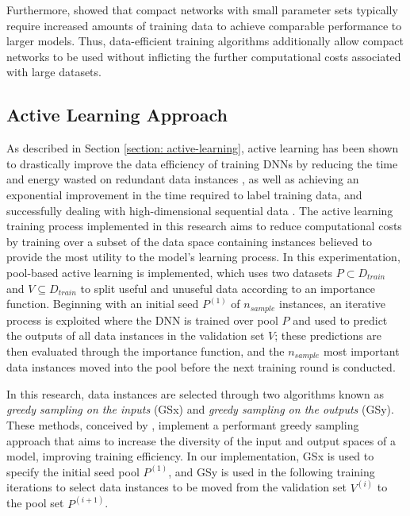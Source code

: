 \documentclass[a4paper, 11pt]{report}
\begin{document}
    Furthermore, \citet{bender-2021} showed that compact networks with small parameter sets typically require increased amounts of training data to achieve comparable performance to larger models. Thus, data-efficient training algorithms additionally allow compact networks to be used without inflicting the further computational costs associated with large datasets.


    \subsection{Active Learning Approach}
    \label{section: al-model}

    As described in Section \ref{section: active-learning}, active learning has been shown to drastically improve the data efficiency of training DNNs by reducing the time and energy wasted on redundant data instances \citep{xu-2021}, as well as achieving an exponential improvement in the time required to label training data, and successfully dealing with high-dimensional sequential data \citep{ren-2021}. The active learning training process implemented in this research aims to reduce computational costs by training over a subset of the data space containing instances believed to provide the most utility to the model's learning process. In this experimentation, pool-based active learning is implemented, which uses two datasets $P \subset D_{train}$ and $V \subseteq D_{train}$ to split useful and unuseful data according to an importance function. Beginning with an initial seed $P^{(1)}$ of $n_{sample}$ instances, an iterative process is exploited where the DNN is trained over pool $P$ and used to predict the outputs of all data instances in the validation set $V$; these predictions are then evaluated through the importance function, and the $n_{sample}$ most important data instances moved into the pool before the next training round is conducted.

    In this research, data instances are selected through two algorithms known as \emph{greedy sampling on the inputs} (GSx) and \emph{greedy sampling on the outputs} (GSy). These methods, conceived by \citet{wu-2019}, implement a performant greedy sampling approach that aims to increase the diversity of the input and output spaces of a model, improving training efficiency. In our implementation, GSx is used to specify the initial seed pool $P^{(1)}$, and GSy is used in the following training iterations to select data instances to be moved from the validation set $V^{(i)}$ to the pool set $P^{(i+1)}$. 
\end{document}

